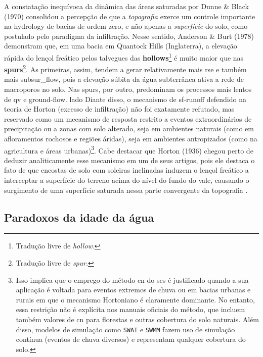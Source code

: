 \documentclass[./main.tex]{subfiles}
\begin{document}
\par A constatação inequívoca da dinâmica das áreas saturadas por Dunne \& Black (1970) consolidou a percepção de que a \textit{topografia} exerce um controle importante na \gls{hydrology} de bacias de ordem zero, e não apenas a \textit{superfície} do solo, como postulado pelo \gls{paradigma} da infiltração. Nesse sentido, Anderson \& Burt (1978) \cite{Anderson1978} demonstram que, em uma bacia em Quantock Hills (Inglaterra), a elevação rápida do lençol freático pelos talvegues das \textbf{\gls{hollows}}\footnote{Tradução livre de \textit{hollow}.} é muito maior que nas \textbf{\gls{spurs}}\footnote{Tradução livre de \textit{spur}.}. As primeiras, assim, tendem a gerar relativamente mais \gls{rse} e também mais \gls{subsur_flow}, pois a elevação súbita da água subterrânea ativa a rede de macroporos no solo. Nas \gls{spurs}, por outro, predominam os processos mais lentos de \gls{qv} e \gls{ground-flow}. lado Diante disso, o mecanismo de \gls{sf-runoff} defendido na \gls{teoria} de Horton (excesso de infiltração) não foi exatamente refutado, mas reservado como um mecanismo de resposta restrito a eventos extraordinários de precipitação ou a zonas com solo alterado, seja em ambientes naturais (como em afloramentos rochosos e regiões áridas), seja em ambientes antropizados (como na agricultura e áreas urbanas)\footnote{Isso implica que o emprego do método \acrshort{cn} do \acrshort{scs} é justificado quando a sua aplicação é voltada para eventos extremos de chuva ou em bacias urbanas e rurais em que o mecanismo Hortoniano é claramente dominante. No entanto, essa restrição não é explícita nos manuais oficiais do método, que incluem também valores de \acrshort{cn} para florestas e outras cobertura do solo naturais. Além disso, modelos de simulação como \texttt{SWAT} e \texttt{SWMM} fazem uso de simulação contínua (eventos de chuva diversos) e representam qualquer cobertura do solo.}. Cabe destacar que Horton (1936) \cite{Horton1936} chegou perto de deduzir analiticamente esse mecanismo em um de seus artigos, pois ele destaca o fato de que encostas de solo com soleiras inclinadas induzem o lençol freático a interceptar a superfície do terreno acima do nível do fundo do vale, causando o surgimento de uma superfície saturada nessa parte convergente da topografia \cite{Beven2004b}.

\subsection{Paradoxos da idade da água}
\end{document}
